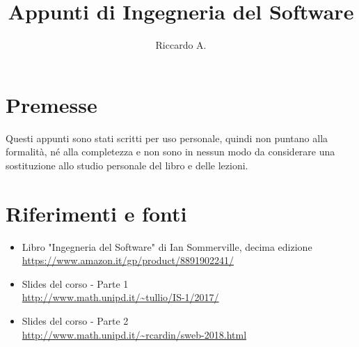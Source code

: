 

\author{Riccardo A.}
\title{Appunti di Ingegneria del Software}



\maketitle

\section*{Premesse}
Questi appunti sono stati scritti per uso personale, quindi non puntano alla formalità, né alla completezza e non sono in nessun modo da considerare una sostituzione allo studio personale del libro e delle lezioni. 

\section*{Riferimenti e fonti}
\begin{itemize}
\item Libro "Ingegneria del Software" di Ian Sommerville, decima edizione\\
\url{https://www.amazon.it/gp/product/8891902241/}
\item Slides del corso - Parte 1 \\
\url{http://www.math.unipd.it/~tullio/IS-1/2017/}
\item Slides del corso - Parte 2 \\
\url{http://www.math.unipd.it/~rcardin/sweb-2018.html}
\end{itemize}

\tableofcontents
\newpage



